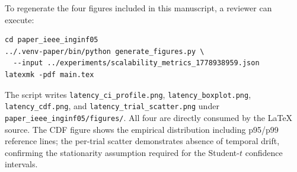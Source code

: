 To regenerate the four figures included in this manuscript, a reviewer can execute:
\begin{verbatim}
cd paper_ieee_inginf05
../.venv-paper/bin/python generate_figures.py \
  --input ../experiments/scalability_metrics_1778938959.json
latexmk -pdf main.tex
\end{verbatim}
The script writes \texttt{latency\_ci\_profile.png}, \texttt{latency\_boxplot.png}, \texttt{latency\_cdf.png}, and \texttt{latency\_trial\_scatter.png} under \texttt{paper\_ieee\_inginf05/figures/}. All four are directly consumed by the LaTeX source. The CDF figure shows the empirical distribution including p95/p99 reference lines; the per-trial scatter demonstrates absence of temporal drift, confirming the stationarity assumption required for the Student-$t$ confidence intervals.
